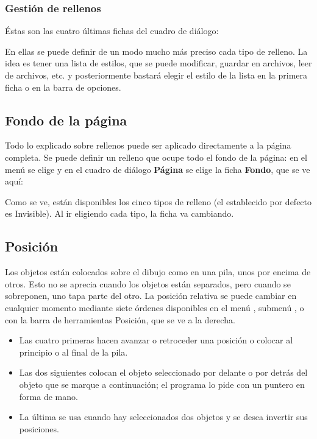 \subsubsection{Gestión de rellenos}

Éstas son las cuatro últimas fichas del cuadro de diálogo:

En ellas se puede definir de un modo mucho más preciso cada tipo de
relleno. La idea es tener una lista de estilos, que se puede
modificar, guardar en archivos, leer de archivos, etc. y
posteriormente bastará elegir el estilo de la lista en la primera
ficha o en la barra de opciones.

\subsection{Fondo de la página}

Todo lo explicado sobre rellenos puede ser aplicado directamente a la
página completa. Se puede definir un relleno que ocupe todo el fondo
de la página: en el menú  se elige  y en el
cuadro de diálogo \textbf{Página} se elige la ficha \textbf{Fondo},
que se ve aquí:

Como se ve, están disponibles los cinco tipos de relleno (el
establecido por defecto es Invisible). Al ir eligiendo cada tipo, la
ficha va cambiando.

\subsection{Posición}

Los objetos están colocados sobre el dibujo como en una pila, unos por
encima de otros. Esto no se aprecia cuando los objetos están
separados, pero cuando se sobreponen, uno tapa parte del otro. La
posición relativa se puede cambiar en cualquier momento mediante siete
órdenes disponibles en el menú , submenú
, o con la barra de herramientas Posición, que se ve a
la derecha.

\begin{itemize}
\item Las cuatro primeras hacen avanzar o retroceder una posición o 
colocar al principio o al final de la pila.

\item Las dos siguientes colocan el objeto seleccionado por delante 
o por detrás del objeto que se marque a continuación; el programa 
lo pide con un puntero en forma de mano.

\item La última se usa cuando hay seleccionados dos objetos y se 
desea invertir sus posiciones.
\end{itemize}

